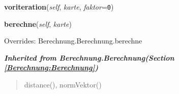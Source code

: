     \vspace{0.5ex}

\hspace{.8\funcindent}\begin{boxedminipage}{\funcwidth}

    \raggedright \textbf{voriteration}(\textit{self}, \textit{karte}, \textit{faktor}={\tt 0})

\setlength{\parskip}{2ex}
\setlength{\parskip}{1ex}
    \end{boxedminipage}

    \vspace{0.5ex}

\hspace{.8\funcindent}\begin{boxedminipage}{\funcwidth}

    \raggedright \textbf{berechne}(\textit{self}, \textit{karte})

\setlength{\parskip}{2ex}
\setlength{\parskip}{1ex}
      Overrides: Berechnung.Berechnung.berechne

    \end{boxedminipage}


\large{\textbf{\textit{Inherited from Berechnung.Berechnung\textit{(Section \ref{Berechnung:Berechnung})}}}}

\begin{quote}
distance(), normVektor()
\end{quote}
